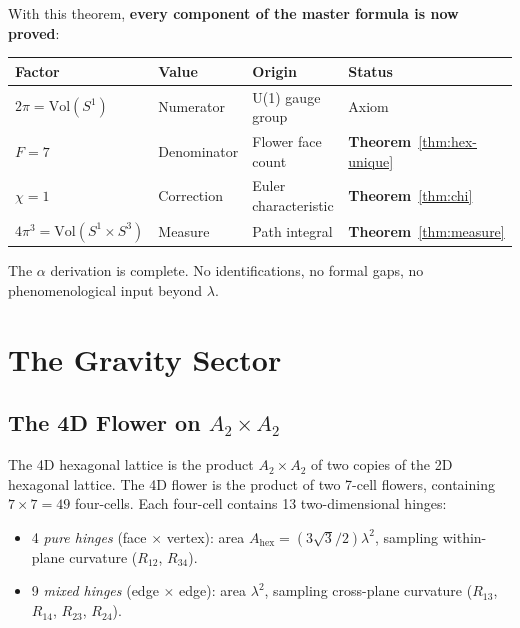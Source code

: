 \documentclass[12pt,a4paper]{article}
\theoremstyle{plain}
\theoremstyle{definition}
\begin{document}
With this theorem, \textbf{every component of the master formula is now proved}:
\begin{center}
\begin{tabular}{llll}
\toprule
\textbf{Factor} & \textbf{Value} & \textbf{Origin} & \textbf{Status} \\
\midrule
$2\pi = \mathrm{Vol}(S^1)$ & Numerator & U(1) gauge group & Axiom \\
$F = 7$ & Denominator & Flower face count & \textbf{Theorem}~\ref{thm:hex-unique} \\
$\chi = 1$ & Correction & Euler characteristic & \textbf{Theorem}~\ref{thm:chi} \\
$4\pi^3 = \mathrm{Vol}(S^1 \times S^3)$ & Measure & Path integral & \textbf{Theorem}~\ref{thm:measure} \\
\bottomrule
\end{tabular}
\end{center}

The $\alpha$ derivation is complete. No identifications, no formal gaps, no phenomenological input beyond $\lambda$.


\section{The Gravity Sector}\label{sec:gravity}

\subsection{The 4D Flower on $A_2 \times A_2$}

The 4D hexagonal lattice is the product $A_2 \times A_2$ of two copies of the 2D hexagonal lattice. The 4D flower is the product of two 7-cell flowers, containing $7 \times 7 = 49$ four-cells. Each four-cell contains 13 two-dimensional hinges:
\begin{itemize}[nosep]
\item 4 \emph{pure hinges} (face $\times$ vertex): area $A_{\mathrm{hex}} = (3\sqrt{3}/2)\lambda^2$, sampling within-plane curvature ($R_{12}$, $R_{34}$).
\item 9 \emph{mixed hinges} (edge $\times$ edge): area $\lambda^2$, sampling cross-plane curvature ($R_{13}$, $R_{14}$, $R_{23}$, $R_{24}$).
\end{itemize}
\end{document}
